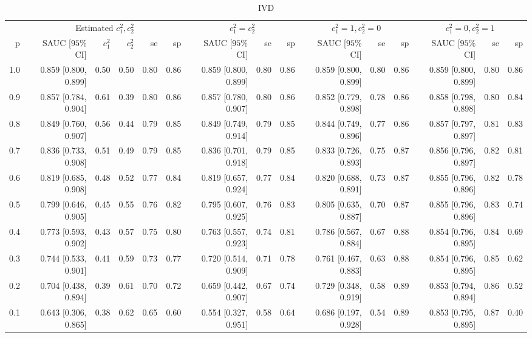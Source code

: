 \begin{table}

\caption{IVD}
\centering
\begin{tabular}[t]{rrrrrrrrrrrrrrr}
\toprule
\multicolumn{1}{c}{ } & \multicolumn{5}{c}{Estimated $c_1^2, c_2^2$} & \multicolumn{3}{c}{$c_1^2 = c_2^2$} & \multicolumn{3}{c}{$c_1^2 = 1, c_2^2 = 0$} & \multicolumn{3}{c}{$c_1^2 = 0, c_2^2 = 1$} \\
\cmidrule(l{3pt}r{3pt}){2-6} \cmidrule(l{3pt}r{3pt}){7-9} \cmidrule(l{3pt}r{3pt}){10-12} \cmidrule(l{3pt}r{3pt}){13-15}
p & SAUC [$95\%$ CI] & $c_1^2$ & $c_2^2$ & se & sp & SAUC [$95\%$ CI] & se & sp & SAUC [$95\%$ CI] & se & sp & SAUC [$95\%$ CI] & se & sp\\
\midrule
1.0 & 0.859 [0.800, 0.899] & 0.50 & 0.50 & 0.80 & 0.86 & 0.859 [0.800, 0.899] & 0.80 & 0.86 & 0.859 [0.800, 0.899] & 0.80 & 0.86 & 0.859 [0.800, 0.899] & 0.80 & 0.86\\
0.9 & 0.857 [0.784, 0.904] & 0.61 & 0.39 & 0.80 & 0.86 & 0.857 [0.780, 0.907] & 0.80 & 0.86 & 0.852 [0.779, 0.898] & 0.78 & 0.86 & 0.858 [0.798, 0.898] & 0.80 & 0.84\\
0.8 & 0.849 [0.760, 0.907] & 0.56 & 0.44 & 0.79 & 0.85 & 0.849 [0.749, 0.914] & 0.79 & 0.85 & 0.844 [0.749, 0.896] & 0.77 & 0.86 & 0.857 [0.797, 0.897] & 0.81 & 0.83\\
0.7 & 0.836 [0.733, 0.908] & 0.51 & 0.49 & 0.79 & 0.85 & 0.836 [0.701, 0.918] & 0.79 & 0.85 & 0.833 [0.726, 0.893] & 0.75 & 0.87 & 0.856 [0.796, 0.897] & 0.82 & 0.81\\
0.6 & 0.819 [0.685, 0.908] & 0.48 & 0.52 & 0.77 & 0.84 & 0.819 [0.657, 0.924] & 0.77 & 0.84 & 0.820 [0.688, 0.891] & 0.73 & 0.87 & 0.855 [0.796, 0.896] & 0.82 & 0.78\\
0.5 & 0.799 [0.646, 0.905] & 0.45 & 0.55 & 0.76 & 0.82 & 0.795 [0.607, 0.925] & 0.76 & 0.83 & 0.805 [0.635, 0.887] & 0.70 & 0.87 & 0.855 [0.796, 0.896] & 0.83 & 0.74\\
0.4 & 0.773 [0.593, 0.902] & 0.43 & 0.57 & 0.75 & 0.80 & 0.763 [0.557, 0.923] & 0.74 & 0.81 & 0.786 [0.567, 0.884] & 0.67 & 0.88 & 0.854 [0.796, 0.895] & 0.84 & 0.69\\
0.3 & 0.744 [0.533, 0.901] & 0.41 & 0.59 & 0.73 & 0.77 & 0.720 [0.514, 0.909] & 0.71 & 0.78 & 0.761 [0.467, 0.883] & 0.63 & 0.88 & 0.854 [0.796, 0.895] & 0.85 & 0.62\\
0.2 & 0.704 [0.438, 0.894] & 0.39 & 0.61 & 0.70 & 0.72 & 0.659 [0.442, 0.907] & 0.67 & 0.74 & 0.729 [0.348, 0.919] & 0.58 & 0.89 & 0.853 [0.794, 0.894] & 0.86 & 0.52\\
0.1 & 0.643 [0.306, 0.865] & 0.38 & 0.62 & 0.65 & 0.60 & 0.554 [0.327, 0.951] & 0.58 & 0.64 & 0.686 [0.197, 0.928] & 0.54 & 0.89 & 0.853 [0.795, 0.895] & 0.87 & 0.40\\
\bottomrule
\end{tabular}
\end{table}
